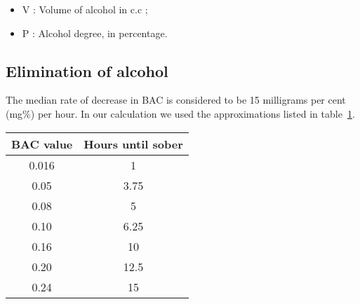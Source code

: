 \begin{itemize}
\item V : Volume of alcohol in c.c ;
\item P : Alcohol degree, in percentage.
\end{itemize}

\subsection{Elimination of alcohol}
\label{ssec:elim}

The median rate of decrease in BAC is considered to be 15 milligrams per cent (mg\%) per hour. In our calculation we used the approximations listed in {\sc table}~\ref{tab:elim}.

\begin{table}[H]
\centering
\begin{tabular}{|c|c|}
  \hline
  \bf{BAC value} & \bf{Hours until sober}\\
  \hline
	0.016 & 1\\
	0.05 & 3.75\\
	0.08 & 5\\
	0.10 & 6.25\\
	0.16 & 10\\
	0.20 & 12.5\\
	0.24 & 15\\
  \hline
\end{tabular}
\label{tab:elim}
\end{table}